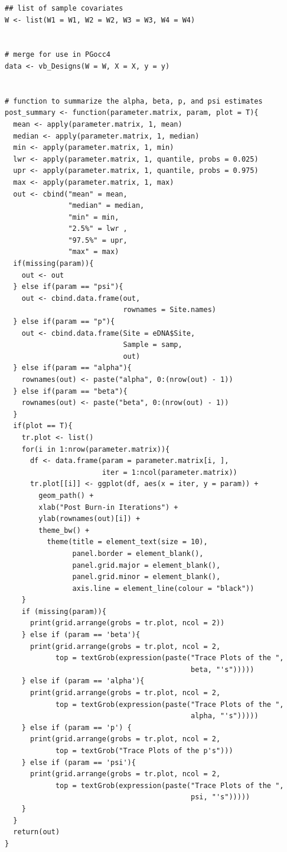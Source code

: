 \documentclass[12pt]{article}\usepackage[]{graphicx}\usepackage[]{color}
\makeatletter
\newenvironment{kframe}{%
 \def\at@end@of@kframe{}%
 \ifinner\ifhmode%
  \def\at@end@of@kframe{\end{minipage}}%
  \begin{minipage}{\columnwidth}%
 \fi\fi%
 \def\FrameCommand##1{\hskip\@totalleftmargin \hskip-\fboxsep
 \colorbox{shadecolor}{##1}\hskip-\fboxsep
     \hskip-\linewidth \hskip-\@totalleftmargin \hskip\columnwidth}%
 \MakeFramed {\advance\hsize-\width
   \@totalleftmargin\z@ \linewidth\hsize
   \@setminipage}}%
 {\par\unskip\endMakeFramed%
 \at@end@of@kframe}
\newenvironment{knitrout}{}{} %
\newenvironment{kframe}{%
 \def\at@end@of@kframe{}%
 \ifinner\ifhmode%
  \def\at@end@of@kframe{\end{minipage}}%
  \begin{minipage}{\columnwidth}%
 \fi\fi%
 \def\FrameCommand##1{\hskip\@totalleftmargin \hskip-\fboxsep
 \colorbox{shadecolor}{##1}\hskip-\fboxsep
     \hskip-\linewidth \hskip-\@totalleftmargin \hskip\columnwidth}%
 \MakeFramed {\advance\hsize-\width
   \@totalleftmargin\z@ \linewidth\hsize
   \@setminipage}}%
 {\par\unskip\endMakeFramed%
 \at@end@of@kframe}
\newenvironment{knitrout}{}{} %
\makeatother
\begin{document}
\begin{small}
\begin{knitrout}
\begin{kframe}
\begin{verbatim}
## list of sample covariates
W <- list(W1 = W1, W2 = W2, W3 = W3, W4 = W4)


# merge for use in PGocc4
data <- vb_Designs(W = W, X = X, y = y)


# function to summarize the alpha, beta, p, and psi estimates 
post_summary <- function(parameter.matrix, param, plot = T){
  mean <- apply(parameter.matrix, 1, mean)
  median <- apply(parameter.matrix, 1, median)
  min <- apply(parameter.matrix, 1, min)
  lwr <- apply(parameter.matrix, 1, quantile, probs = 0.025)
  upr <- apply(parameter.matrix, 1, quantile, probs = 0.975)
  max <- apply(parameter.matrix, 1, max)
  out <- cbind("mean" = mean, 
               "median" = median, 
               "min" = min, 
               "2.5%" = lwr , 
               "97.5%" = upr, 
               "max" = max)
  if(missing(param)){
    out <- out
  } else if(param == "psi"){
    out <- cbind.data.frame(out, 
                            rownames = Site.names)
  } else if(param == "p"){
    out <- cbind.data.frame(Site = eDNA$Site, 
                            Sample = samp, 
                            out)
  } else if(param == "alpha"){
    rownames(out) <- paste("alpha", 0:(nrow(out) - 1))
  } else if(param == "beta"){
    rownames(out) <- paste("beta", 0:(nrow(out) - 1))
  }
  if(plot == T){
    tr.plot <- list()
    for(i in 1:nrow(parameter.matrix)){
      df <- data.frame(param = parameter.matrix[i, ], 
                       iter = 1:ncol(parameter.matrix))
      tr.plot[[i]] <- ggplot(df, aes(x = iter, y = param)) + 
        geom_path() + 
        xlab("Post Burn-in Iterations") + 
        ylab(rownames(out)[i]) + 
        theme_bw() + 
          theme(title = element_text(size = 10),
                panel.border = element_blank(), 
                panel.grid.major = element_blank(),
                panel.grid.minor = element_blank(), 
                axis.line = element_line(colour = "black"))
    }
    if (missing(param)){
      print(grid.arrange(grobs = tr.plot, ncol = 2))
    } else if (param == 'beta'){
      print(grid.arrange(grobs = tr.plot, ncol = 2, 
            top = textGrob(expression(paste("Trace Plots of the ", 
                                            beta, "'s")))))
    } else if (param == 'alpha'){
      print(grid.arrange(grobs = tr.plot, ncol = 2, 
            top = textGrob(expression(paste("Trace Plots of the ", 
                                            alpha, "'s")))))
    } else if (param == 'p') {
      print(grid.arrange(grobs = tr.plot, ncol = 2, 
            top = textGrob("Trace Plots of the p's")))
    } else if (param == 'psi'){
      print(grid.arrange(grobs = tr.plot, ncol = 2, 
            top = textGrob(expression(paste("Trace Plots of the ", 
                                            psi, "'s")))))
    }
  } 
  return(out)
}



\end{verbatim}
\end{kframe}
\end{knitrout}
\end{small}
\end{document}

